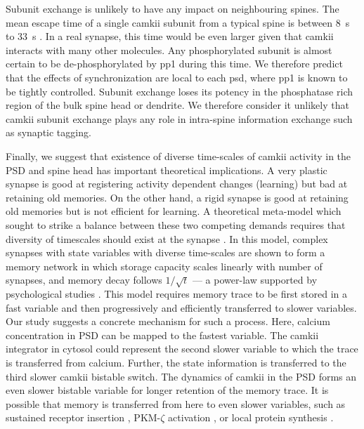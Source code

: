 \documentclass[9pt,lineno,doublespacing]{elife}
\begin{document}
Subunit exchange is unlikely to have any impact on neighbouring spines. The mean
escape time of a single \gls{camkii} subunit from a typical spine is between
\SI{8}{\second} to \SI{33}{\second} \citep{holcman_diffusion_2011}. In a real
synapse, this time would be even larger given that \gls{camkii} interacts with
many other molecules. Any phosphorylated subunit is almost certain to be
de-phosphorylated by \gls{pp1} during this time. We therefore predict that the
effects of synchronization are local to each \gls{psd}, where \gls{pp1} is known
to be tightly controlled.  Subunit exchange loses its potency in the phosphatase
rich region of the bulk spine head or dendrite. We therefore consider it
unlikely that \gls{camkii} subunit exchange plays any role in intra-spine
information exchange such as synaptic tagging.

Finally, we suggest that existence of diverse time-scales of \gls{camkii}
activity in the PSD and spine head has important theoretical implications. A
very plastic synapse is good at registering activity dependent changes
(learning) but bad at retaining old memories. On the other hand, a rigid synapse
is good at retaining old memories but is not efficient for learning. A
theoretical meta-model which sought to strike a balance between these two
competing demands requires that diversity of timescales should exist at the
synapse \citep{benna_computational_2016}. In this model, complex synapses with
state variables with diverse time-scales are shown to form a memory network in
which storage capacity scales linearly with number of synapses, and memory decay
follows \(1/\sqrt{t}\) --- a power-law supported by psychological studies
\citep{wixted_form_1991}. This model requires memory trace to be first stored in
a fast variable and then progressively and efficiently transferred to slower
variables.  Our study suggests a concrete mechanism for such a process. Here,
calcium concentration in PSD can be mapped to the fastest variable.  The
\gls{camkii} integrator in cytosol could represent the second slower variable to
which the trace is transferred from calcium. Further, the state information is
transferred to the third slower \gls{camkii} bistable switch. The dynamics of
\gls{camkii} in the PSD forms an even slower bistable variable for longer
retention of the memory trace. It is possible that memory is transferred from
here to even slower variables, such as sustained receptor insertion
\citep{hayer_molecular_2005}, PKM-$\zeta$ activation \citep{sacktor_memory_2012},
or local protein synthesis \citep{aslam_translational_2009}.
\end{document}
